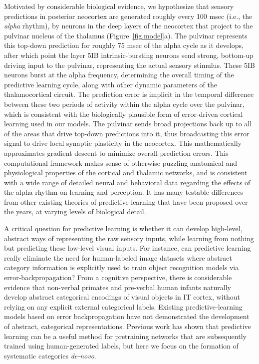 \documentclass[12pt,twoside]{naturefigs}  %
\newif\myifpdf
\begin{document}
Motivated by considerable biological evidence\cite{OReillyWyatteRohrlich14}, we hypothesize that sensory predictions in posterior neocortex are generated roughly every 100 msec (i.e., the {\em alpha} rhythm), by neurons in the deep layers of the neocortex that project to the pulvinar nucleus of the thalamus (Figure~\ref{fig.model}a).  The pulvinar represents this top-down prediction for roughly 75 msec of the alpha cycle as it develops, after which point the layer 5IB intrinsic-bursting neurons send strong, bottom-up driving input to the pulvinar, representing the actual sensory stimulus\cite{ShermanGuillery06}.  These 5IB neurons burst at the alpha frequency, determining the overall timing of the predictive learning cycle, along with other dynamic parameters of the thalamocortical circuit\cite{LorinczKekesiJuhaszEtAl09,FranceschettiGuatteoPanzicaEtAl95,SaalmannPinskWangEtAl12}.  The prediction error is implicit in the temporal difference between these two periods of activity within the alpha cycle over the pulvinar, which is consistent with the biologically plausible form of error-driven cortical learning used in our models\cite{OReilly96}.  The pulvinar sends broad projections back up to all of the areas that drive top-down predictions into it\cite{Shipp03,Mumford91}, thus broadcasting this error signal to drive local synaptic plasticity in the neocortex. This mathematically approximates gradient descent to minimize overall prediction errors.  This computational framework makes sense of otherwise puzzling anatomical and physiological properties of the cortical and thalamic networks\cite{ShermanGuillery06}, and is consistent with a wide range of detailed neural and behavioral data regarding the effects of the alpha rhythm on learning and perception\cite{BuffaloFriesLandmanEtAl11,VanRullenKoch03,JensenBonnefondVanRullen12,FiebelkornKastner19}.  It has many testable differences from other existing theories of predictive learning that have been proposed over the years, at varying levels of biological detail\cite{Mumford92,RaoBallard99,KawatoHayakawaInui93,Friston05}.

A critical question for predictive learning is whether it can develop high-level, abstract ways of representing the raw sensory inputs, while learning from nothing but predicting these low-level visual inputs.  For instance, can predictive learning really eliminate the need for human-labeled image datasets where abstract category information is explicitly used to train object recognition models via error-backpropagation?  From a cognitive perspective, there is considerable evidence that non-verbal primates and pre-verbal human infants naturally develop abstract categorical encodings of visual objects in IT cortex\cite{CadieuHongYaminsEtAl14}, without relying on any explicit external categorical labels.  Existing predictive-learning models based on error backpropagation\cite{LotterKreimanCox16} have not demonstrated the development of abstract, categorical representations.  Previous work has shown that predictive learning can be a useful method for pretraining networks that are subsequently trained using human-generated labels, but here we focus on the formation of systematic categories {\em de-novo}.
\end{document}
